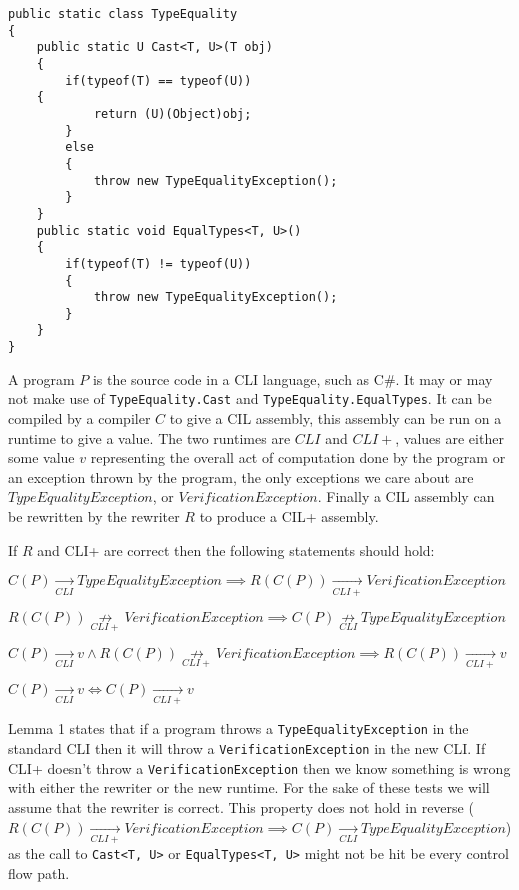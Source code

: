 \begin{lstlisting}[caption={Cast},keywordstyle={\color{blue}},language=sharpc]
public static class TypeEquality
{
	public static U Cast<T, U>(T obj)
	{
		if(typeof(T) == typeof(U))
    {
			return (U)(Object)obj;
		}
		else
		{
			throw new TypeEqualityException();
		}
	}
	public static void EqualTypes<T, U>()
	{
		if(typeof(T) != typeof(U))
		{
			throw new TypeEqualityException();
		}
	}
}
\end{lstlisting}


A program $P$ is the source code in a CLI language, such as C\#. It may or may
not make use of \texttt{TypeEquality.Cast} and
\texttt{TypeEquality.EqualTypes}. It can be compiled by a compiler $C$ to give
a CIL assembly, this assembly can be run on a runtime to give a value. The two
runtimes are $CLI$ and $CLI+$, values are either some value $v$ representing
the overall act of computation done by the program or an exception thrown by
the program, the only exceptions we care about are $TypeEqualityException$, or
$VerificationException$.  Finally a CIL assembly can be rewritten by the
rewriter $R$ to produce a CIL+ assembly.

If $R$ and CLI+ are correct then the following statements should hold:
\begin{lemma}
$C(P) \underset{CLI}{\rightarrow} TypeEqualityException \implies R(C(P))
\underset{CLI+}{\rightarrow} VerificationException$
\end{lemma}
\begin{lemma}
$R(C(P)) \underset{CLI+}{\not\rightarrow} VerificationException \implies
C(P) \underset{CLI}{\not\rightarrow} TypeEqualityException$
\end{lemma}
\begin{lemma}
$C(P) \underset{CLI}{\rightarrow} v \wedge R(C(P))
\underset{CLI+}{\not\rightarrow} VerificationException \implies R(C(P))
\underset{CLI+}{\rightarrow} v$
\end{lemma}
\begin{lemma}
$C(P) \underset{CLI}{\rightarrow} v \iff C(P) \underset{CLI+}{\rightarrow} v$
\end{lemma}

Lemma 1 states that if a program throws a \texttt{TypeEqualityException} in
the standard CLI then it will throw a \texttt{VerificationException} in the new
CLI. If CLI+ doesn't throw a \texttt{VerificationException} then we know
something is wrong with either the rewriter or the new runtime. For the sake of
these tests we will assume that the rewriter is correct. This property does not
hold in reverse ($R(C(P)) \underset{CLI+}{\rightarrow} VerificationException
\implies C(P) \underset{CLI}{\rightarrow} TypeEqualityException$) as the call
to \texttt{Cast<T, U>} or \texttt{EqualTypes<T, U>} might not be hit be every
control flow path.

